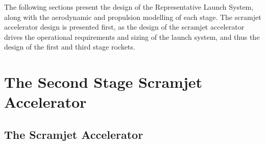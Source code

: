  
 The following sections present the design of the Representative Launch System, along with the aerodynamic and propulsion modelling of each stage.
The scramjet accelerator design is presented first, as the design of the scramjet accelerator drives the operational requirements and sizing of the launch system, and thus the design of the first and third stage rockets. 











	
	
	\section{The Second Stage Scramjet Accelerator}\label{sec:SPARTAN}
		\subsection{The Scramjet Accelerator}
		
